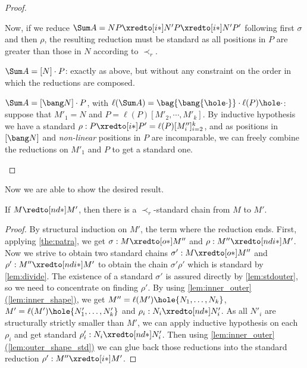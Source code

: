 \begin{proof}
\begin{itemize}
\begin{enumcases}
      Now, if we reduce $\Sum A=NP\xredto[i*]N'P\xredto[i*]N'P'$
      following first $\sigma$ and then $\rho$, the resulting
      reduction must be standard as all positions in $P$ are greater
      than those in $N$ according to $\prec_r$.
    \item $\Sum A=[N]\cdot P$: exactly as above, but without any constraint
      on the order in which the reductions are composed.
    \item $\Sum A=[\bang N]\cdot P$, with $\ell(\Sum A)=\bag{\bang{\hole\cdot}}\cdot
      \ell(P)\hole\cdot$: suppose that $M'_1=N$ and
      $P=\ell(P)[M'_2,\cdots,M'_k]$. By inductive hypothesis we have a
      standard $\rho:P\xredto[i*]P'=\ell(P)[M''_i]_{i=2}^k$, and as
      positions in $[\bang N]$ and \emph{non-linear} positions in $P$
      are incomparable, we can freely combine the reductions on $M'_1$
      and $P$ to get a standard one.\qedhere
  \end{enumcases}
 \end{itemize}
\end{proof}
Now we are able to show the desired result.
\begin{theorem}[Standardization]\label{thm:standard-inner}
If $M\redto[nd*]M'$, then there is a $\prec_r$-standard chain from $M$ to $M'$.
\end{theorem}
\begin{proof}
  By structural induction on $M'$, the term where the reduction ends.
     First, applying \autoref{the:patra}, we get
  $\sigma:M\xredto[o*]M''$ and $\rho:M''\xredto[ndi*]M'$. Now we
  strive to obtain two standard chains $\sigma':M\xredto[o*]M''$ and
  $\rho':M''\xredto[ndi*]M'$ to obtain the chain $\sigma'\rho'$ which
  is standard by \autoref{lem:divide}. The existence of a standard
  $\sigma'$ is assured directly by \autoref{lem:stdouter}, so we
  need to concentrate on finding $\rho'$.
  By using \hyperref[lem:inner_outer]{\autoref*{lem:inner_outer}(\ref*{lem:inner_shape})}, we get
  $M''=\ell(M')\hole{N_1,\dots,N_k}$, $M'=\ell(M')\hole{N'_1,\dots,N'_k}$ and
  $\rho_i:N_i\xredto[nd*]N'_i$. As all $N'_i$ are structurally
  strictly smaller than $M'$, we can apply inductive hypothesis on
  each $\rho_i$ and get standard $\rho_i':N_i\xredto[nd*]N'_i$. Then
  using \hyperref[lem:outer_shape_std]{\autoref*{lem:inner_outer}(\ref*{lem:outer_shape_std})} we can glue back those
  reductions into the standard reduction $\rho':M''\xredto[i*]M'$.
\end{proof}
